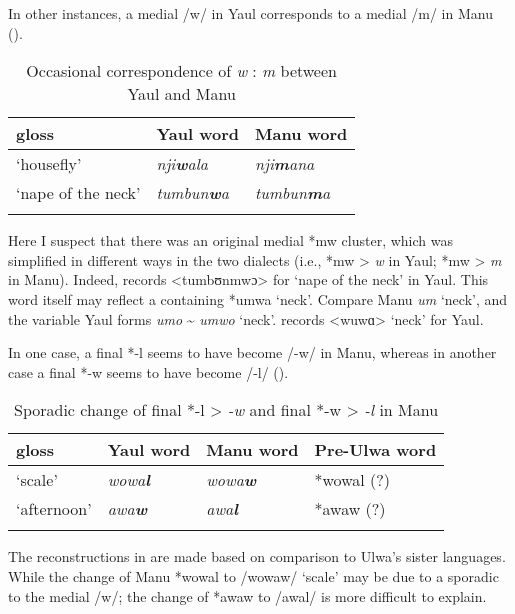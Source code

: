   In other instances, a medial /w/ in Yaul corresponds to a medial /m/ in Manu ().



\begin{table}
\caption{Occasional correspondence of \textit{w} : \textit{m} between Yaul and Manu}
\label{tab:18.13}
\begin{tabular}{lll}

\lsptoprule

gloss & Yaul word & Manu word\\
\midrule
‘housefly’ & {\itshape nji\textbf{w}ala} & {\itshape nji\textbf{m}ana}\\
‘nape of the neck’ & {\itshape tumbun\textbf{w}a} & {\itshape tumbun\textbf{m}a}\\
\lspbottomrule
\end{tabular}
\end{table}
Here I suspect that there was an original medial *mw  cluster, which was simplified in different ways in the two dialects (i.e., *mw > \textit{w} in Yaul; *mw > \textit{m} in Manu). Indeed, \citet[3220]{Laycock1971a} records <tumbʊnmwɔ> for ‘nape of the neck’ in Yaul. This word itself may reflect a  containing *umwa ‘neck’. Compare Manu \textit{um} ‘neck’, and the variable Yaul forms \textit{umo} {\textasciitilde} \textit{umwo} ‘neck’. \linebreak \citet[3220]{Laycock1971a} records <wuwɑ> ‘neck’ for Yaul.

  In one case, a final *-l seems to have become /-w/ in Manu, whereas in another case a final *-w seems to have become /-l/ ().


\begin{table}
\caption{Sporadic change of final *-l > \textit{{}-w} and final *-w > \textit{{}-l} in Manu}
\label{tab:18.14}


\begin{tabular}{llll}

\lsptoprule

gloss & Yaul word & Manu word & Pre-Ulwa word\\
\midrule
‘scale’ & {\itshape wowa\textbf{l}} & {\itshape wowa\textbf{w}} & *wowal (?)\\
‘afternoon’ & {\itshape awa\textbf{w}} & {\itshape awa\textbf{l}} & *awaw (?)\\
\lspbottomrule
\end{tabular}
\end{table}
The reconstructions in  are made based on comparison to Ulwa’s sister languages. While the change of Manu *wowal to /wowaw/ ‘scale’ may be due to a sporadic   to the medial /w/; the change of *awaw to /awal/ is more difficult to explain.

